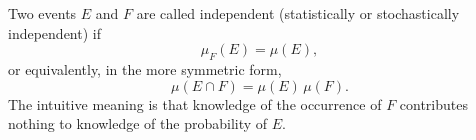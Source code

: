 Two events $E$ and $F$ are called independent (statistically or stochastically independent) if
$$\mu_F(E) = \mu(E),$$
or equivalently, in the more symmetric form,
$$\mu(E \cap F) = \mu(E) \, \mu(F).$$
The intuitive meaning is that knowledge of the occurrence of $F$ contributes nothing to knowledge of the probability of $E$.

